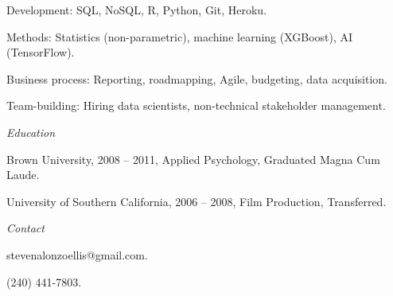 \documentclass[12pt]{res}
\begin{document}
{\begin{resume}
\begin{list}{}{\leftmargin=1em}
{\begin{list}{-}{\leftmargin=1em}
\item Development: SQL, NoSQL, R, Python, Git, Heroku.
\item Methods: Statistics (non-parametric), machine learning (XGBoost), AI (TensorFlow).
\item Business process: Reporting, roadmapping, Agile, budgeting, data acquisition. 
\item Team-building: Hiring data scientists, non-technical stakeholder management.
\end{list}}
\item
\item{\centering \textit{Education}
\item
\begin{list}{-}{\leftmargin=1em}
\item Brown University, 2008 -- 2011, Applied Psychology, Graduated Magna Cum Laude. 
\item University of Southern California, 2006 -- 2008, Film Production, Transferred. 
\end{list}}
\item
\item{\centering \textit{Contact}
\item
\begin{list}{-}{\leftmargin=1em}
\item stevenalonzoellis@gmail.com.
\item (240) 441-7803.
\end{list}}
\item
\end{list}
\end{resume}
} %
\end{document}
